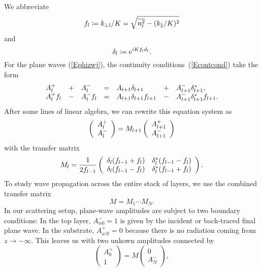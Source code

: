 We abbreviate
\begin{equation}
  f_l \coloneqq  k_{\perp l}/K = \sqrt{\overline{n_l^2}-(k_\parallel/K)^2}
\end{equation}
and
\begin{equation}
   \delta_l \coloneqq  \text{e}^{iKf_l d_l}.
\end{equation}
For the plane waves (\ref{Ephizwj}),
the continuity conditions~(\ref{Econtcond}) take the form
\begin{equation}\label{Econt2}
  \begin{array}{lclclcl}
  A^+_l &+& A^-_l
  &=&
  A_{l+1}\delta_{l+1} &+& A^-_{l+1}\delta_{l+1}^*,
  \\
  A^+_l f_l  &-& A^-_l f_l
  &=&
  A_{l+1}\delta_{l+1} f_{l+1} &-& A^-_{l+1}\delta_{l+1}^* f_{l+1}.
  \end{array}
\end{equation}
After some lines of linear algebra,
we can rewrite this equation system as
\begin{equation}\label{EcMc}
  \left( \begin{array}{c}A^+_l\\A^-_l\end{array} \right)
  = M_{l+1} \left( \begin{array}{c}A^+_{l+1}\\A^-_{l+1}\end{array} \right)
\end{equation}
with the transfer matrix
\begin{equation}
  M_l
   = \frac{1}{2f_{l-1}}
   \left(\begin{array}{cc}
       \delta_l(f_{l-1}+f_l)&\delta_l^*(f_{l-1}-f_l)\\
       \delta_l(f_{l-1}-f_l)&\delta_l^*(f_{l-1}+f_l)
   \end{array}\right).
\end{equation}
To study wave propagation across the entire stack of layers,
we use the combined transfer matrix
\begin{equation}
   M = M_1 \cdots M_N.
\end{equation}
In our scattering setup,
plane-wave amplitudes are subject to two boundary conditions:
In the top layer, $A^-_{w0}=1$ is given by the
incident or back-traced final plane wave.
In the substrate, $A^+_{wN}=0$ because there is no radiation
coming from $z\to-\infty$.
This leaves us with two unkown amplitudes connected by
\begin{equation}
  \left( \begin{array}{c}A^+_0\\1\end{array} \right)
  = M \left( \begin{array}{c}0\\A^-_N\end{array} \right),
\end{equation}
